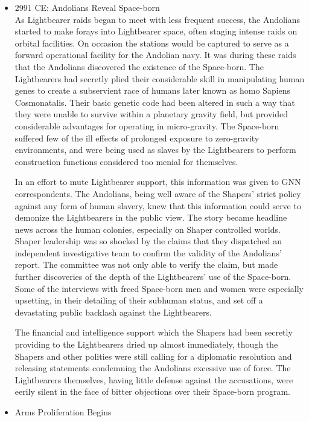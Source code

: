 \begin{itemize}
\item 2991 CE: Andolians Reveal Space-born \\

As Lightbearer raids began to meet with less frequent success, the
Andolians started to make forays into Lightbearer space, often staging
intense raids on orbital facilities.  On occasion the stations would
be captured to serve as a forward operational facility for the
Andolian navy.  It was during these raids that the Andolians
discovered the existence of the Space-born.  The Lightbearers had
secretly plied their considerable skill in manipulating human genes to
create a subservient race of humans later known as homo Sapiens
Cosmonatalis.  Their basic genetic code had been altered in such a way
that they were unable to survive within a planetary gravity field, but
provided considerable advantages for operating in micro-gravity.  The
Space-born suffered few of the ill effects of prolonged exposure to
zero-gravity environments, and were being used as slaves by the
Lightbearers to perform construction functions considered too menial
for themselves.

In an effort to mute Lightbearer support, this information was given
to GNN correspondents.  The Andolians, being well aware of the
Shapers' strict policy against any form of human slavery, knew that
this information could serve to demonize the Lightbearers in the
public view.  The story became headline news across the human
colonies, especially on Shaper controlled worlds.  Shaper leadership
was so shocked by the claims that they dispatched an independent
investigative team to confirm the validity of the Andolians' report.
The committee was not only able to verify the claim, but made further
discoveries of the depth of the Lightbearers' use of the Space-born.
Some of the interviews with freed Space-born men and women were
especially upsetting, in their detailing of their subhuman status, and
set off a devastating public backlash against the Lightbearers.

The financial and intelligence support which the Shapers had been
secretly providing to the Lightbearers dried up almost immediately,
though the Shapers and other polities were still calling for a
diplomatic resolution and releasing statements condemning the
Andolians excessive use of force.  The Lightbearers themselves,
having little defense against the accusations, were eerily silent in
the face of bitter objections over their Space-born program.

\item Arms Proliferation Begins \\


\end{itemize}
